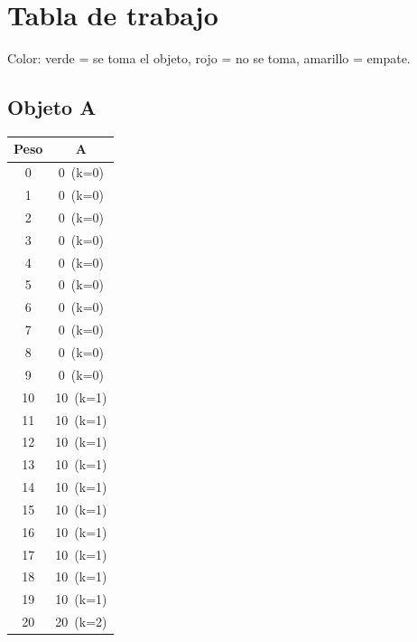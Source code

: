 \documentclass[12pt]{article}
\begin{document}
\section*{Tabla de trabajo}
Color: {\color{green}verde} = se toma el objeto, {\color{red}rojo} = no se toma, {\color{yellow}amarillo} = empate.\\
\begin{landscape}
\subsection*{Objeto A}
\begin{longtable}{cc}
\toprule
Peso & A \\
\midrule
0 & \cellcolor{red!20}0~(k=0) \\
1 & \cellcolor{red!20}0~(k=0) \\
2 & \cellcolor{red!20}0~(k=0) \\
3 & \cellcolor{red!20}0~(k=0) \\
4 & \cellcolor{red!20}0~(k=0) \\
5 & \cellcolor{red!20}0~(k=0) \\
6 & \cellcolor{red!20}0~(k=0) \\
7 & \cellcolor{red!20}0~(k=0) \\
8 & \cellcolor{red!20}0~(k=0) \\
9 & \cellcolor{red!20}0~(k=0) \\
10 & \cellcolor{green!40}10~(k=1) \\
11 & \cellcolor{green!40}10~(k=1) \\
12 & \cellcolor{green!40}10~(k=1) \\
13 & \cellcolor{green!40}10~(k=1) \\
14 & \cellcolor{green!40}10~(k=1) \\
15 & \cellcolor{green!40}10~(k=1) \\
16 & \cellcolor{green!40}10~(k=1) \\
17 & \cellcolor{green!40}10~(k=1) \\
18 & \cellcolor{green!40}10~(k=1) \\
19 & \cellcolor{green!40}10~(k=1) \\
20 & \cellcolor{green!40}20~(k=2) \\
\bottomrule
\end{longtable}
\end{landscape}
\end{document}
